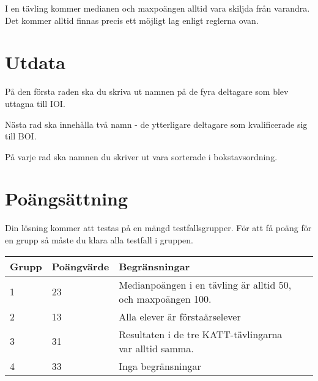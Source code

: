 I en tävling kommer medianen och maxpoängen alltid vara skiljda från varandra.
Det kommer alltid finnas precis ett möjligt lag enligt reglerna ovan.

\section*{Utdata}
På den första raden ska du skriva ut namnen på de fyra deltagare som blev uttagna till IOI.

Nästa rad ska innehålla två namn - de ytterligare deltagare som kvalificerade sig till BOI.

På varje rad ska namnen du skriver ut vara sorterade i bokstavsordning.

\section*{Poängsättning}
Din lösning kommer att testas på en mängd testfallsgrupper. För att få poäng för en grupp så måste du klara alla testfall i gruppen.

\begin{tabular}{| l | l | l | l |}
\hline
Grupp & Poängvärde & Begränsningar \\ \hline
1     & 23         & Medianpoängen i en tävling är alltid 50, och maxpoängen 100. \\ \hline
2     & 13         & Alla elever är förstaårselever \\ \hline
3     & 31         & Resultaten i de tre KATT-tävlingarna var alltid samma. \\ \hline
4     & 33         & Inga begränsningar \\ \hline
\end{tabular}
